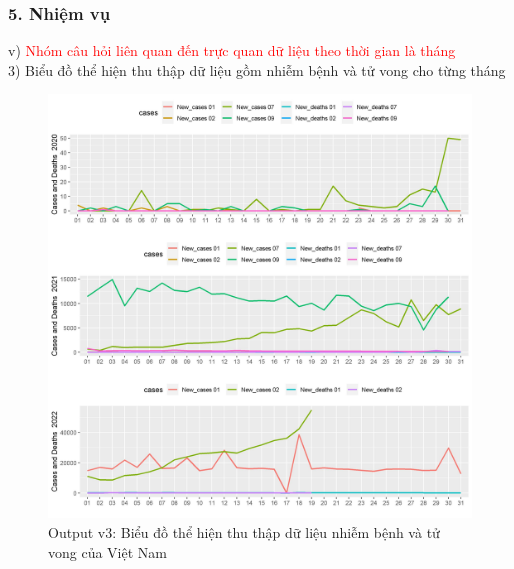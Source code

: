 \documentclass[english,10pt,table]{beamer}
\begin{document}
\begin{frame}[fragile]
\frametitle{5.  Nhiệm vụ}
v) \textcolor{red}{Nhóm câu hỏi liên quan đến trực quan dữ liệu theo thời gian là tháng}\\
    3) Biểu đồ thể hiện thu thập dữ liệu gồm nhiễm bệnh và tử vong cho từng tháng
	\begin{figure}[h!]
	\begin{center}
		    \includegraphics[scale = 0.25]{Images/V/v3 Vietnam .jpeg}
		     \caption{Output v3: Biểu đồ thể hiện thu thập dữ liệu nhiễm bệnh và tử vong của Việt Nam}
		\end{center}
		\end{figure}
\end{frame}
\end{document}
